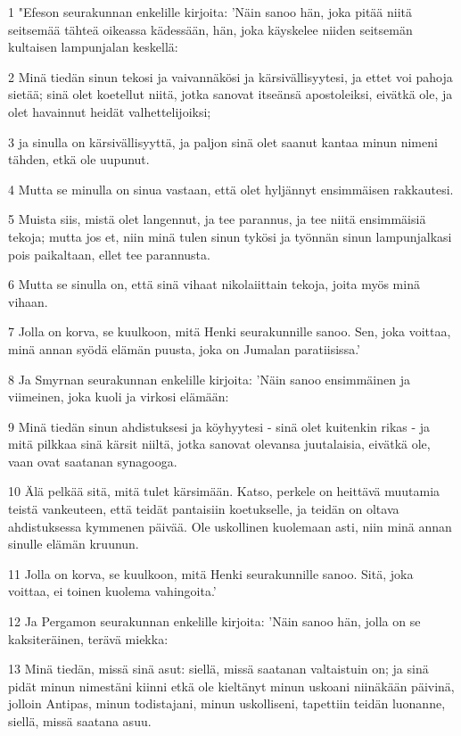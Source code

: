 \par 1 "Efeson seurakunnan enkelille kirjoita: 'Näin sanoo hän, joka pitää niitä seitsemää tähteä oikeassa kädessään, hän, joka käyskelee niiden seitsemän kultaisen lampunjalan keskellä:
\par 2 Minä tiedän sinun tekosi ja vaivannäkösi ja kärsivällisyytesi, ja ettet voi pahoja sietää; sinä olet koetellut niitä, jotka sanovat itseänsä apostoleiksi, eivätkä ole, ja olet havainnut heidät valhettelijoiksi;
\par 3 ja sinulla on kärsivällisyyttä, ja paljon sinä olet saanut kantaa minun nimeni tähden, etkä ole uupunut.
\par 4 Mutta se minulla on sinua vastaan, että olet hyljännyt ensimmäisen rakkautesi.
\par 5 Muista siis, mistä olet langennut, ja tee parannus, ja tee niitä ensimmäisiä tekoja; mutta jos et, niin minä tulen sinun tykösi ja työnnän sinun lampunjalkasi pois paikaltaan, ellet tee parannusta.
\par 6 Mutta se sinulla on, että sinä vihaat nikolaiittain tekoja, joita myös minä vihaan.
\par 7 Jolla on korva, se kuulkoon, mitä Henki seurakunnille sanoo. Sen, joka voittaa, minä annan syödä elämän puusta, joka on Jumalan paratiisissa.'
\par 8 Ja Smyrnan seurakunnan enkelille kirjoita: 'Näin sanoo ensimmäinen ja viimeinen, joka kuoli ja virkosi elämään:
\par 9 Minä tiedän sinun ahdistuksesi ja köyhyytesi - sinä olet kuitenkin rikas - ja mitä pilkkaa sinä kärsit niiltä, jotka sanovat olevansa juutalaisia, eivätkä ole, vaan ovat saatanan synagooga.
\par 10 Älä pelkää sitä, mitä tulet kärsimään. Katso, perkele on heittävä muutamia teistä vankeuteen, että teidät pantaisiin koetukselle, ja teidän on oltava ahdistuksessa kymmenen päivää. Ole uskollinen kuolemaan asti, niin minä annan sinulle elämän kruunun.
\par 11 Jolla on korva, se kuulkoon, mitä Henki seurakunnille sanoo. Sitä, joka voittaa, ei toinen kuolema vahingoita.'
\par 12 Ja Pergamon seurakunnan enkelille kirjoita: 'Näin sanoo hän, jolla on se kaksiteräinen, terävä miekka:
\par 13 Minä tiedän, missä sinä asut: siellä, missä saatanan valtaistuin on; ja sinä pidät minun nimestäni kiinni etkä ole kieltänyt minun uskoani niinäkään päivinä, jolloin Antipas, minun todistajani, minun uskolliseni, tapettiin teidän luonanne, siellä, missä saatana asuu.
